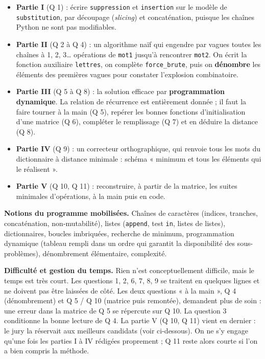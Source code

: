 \documentclass[11pt,a4paper]{article}
\providecommand{\tightlist}{\setlength{\itemsep}{0pt}\setlength{\parskip}{0pt}}
\begin{document}
\begin{itemize}
\tightlist
\item
  \textbf{Partie I} (Q 1) : écrire \texttt{suppression} et \texttt{insertion} sur le modèle de \texttt{substitution}, par découpage (\emph{slicing}) et concaténation, puisque les chaînes Python ne sont pas modifiables.
\item
  \textbf{Partie II} (Q 2 à Q 4) : un algorithme naïf qui engendre par vagues toutes les chaînes à 1, 2, 3\ldots{} opérations de \texttt{mot1} jusqu'à rencontrer \texttt{mot2}. On écrit la fonction auxiliaire \texttt{lettres}, on complète \texttt{force\_brute}, puis on \textbf{dénombre} les éléments des premières vagues pour constater l'explosion combinatoire.
\item
  \textbf{Partie III} (Q 5 à Q 8) : la solution efficace par \textbf{programmation dynamique}. La relation de récurrence est entièrement donnée ; il faut la faire tourner à la main (Q 5), repérer les bonnes fonctions d'initialisation d'une matrice (Q 6), compléter le remplissage (Q 7) et en déduire la distance (Q 8).
\item
  \textbf{Partie IV} (Q 9) : un correcteur orthographique, qui renvoie tous les mots du dictionnaire à distance minimale : schéma « minimum et tous les éléments qui le réalisent ».
\item
  \textbf{Partie V} (Q 10, Q 11) : reconstruire, à partir de la matrice, les suites minimales d'opérations, à la main puis en code.
\end{itemize}

\textbf{Notions du programme mobilisées.} Chaînes de caractères (indices, tranches, concaténation, non-mutabilité), listes (\texttt{append}, test \texttt{in}, listes de listes), dictionnaires, boucles imbriquées, recherche de minimum, programmation dynamique (tableau rempli dans un ordre qui garantit la disponibilité des sous-problèmes), dénombrement élémentaire, complexité.

\textbf{Difficulté et gestion du temps.} Rien n'est conceptuellement difficile, mais le temps est très court. Les questions 1, 2, 6, 7, 8, 9 se traitent en quelques lignes et ne doivent pas être laissées de côté. Les deux questions « à la main », Q 4 (dénombrement) et Q 5 / Q 10 (matrice puis remontée), demandent plus de soin : une erreur dans la matrice de Q 5 se répercute sur Q 10. La question 3 conditionne la bonne lecture de Q 4. La partie V (Q 10, Q 11) vient en dernier : le jury la réservait aux meilleurs candidats (voir ci-dessous). On ne s'y engage qu'une fois les parties I à IV rédigées proprement ; Q 11 reste alors courte si l'on a bien compris la méthode.
\end{document}
